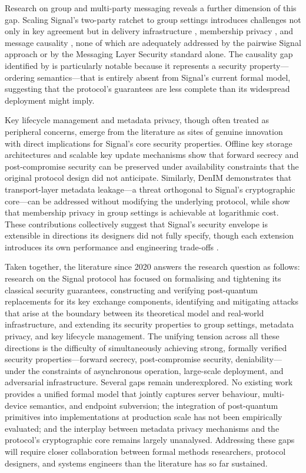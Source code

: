 Research on group and multi-party messaging reveals a further dimension of this gap. Scaling Signal's two-party ratchet to group settings introduces challenges not only in key agreement but in delivery infrastructure \parencite{paillat2024,paillat2025}, membership privacy \parencite{emura2023}, and message causality \parencite{chen2024}, none of which are adequately addressed by the pairwise Signal approach or by the Messaging Layer Security standard alone. The causality gap identified by \textcite{chen2024} is particularly notable because it represents a security property—ordering semantics—that is entirely absent from Signal's current formal model, suggesting that the protocol's guarantees are less complete than its widespread deployment might imply.

Key lifecycle management and metadata privacy, though often treated as peripheral concerns, emerge from the literature as sites of genuine innovation with direct implications for Signal's core security properties. Offline key storage architectures \parencite{almari2024} and scalable key update mechanisms \parencite{emura2023,campion2020} show that forward secrecy and post-compromise security can be preserved under availability constraints that the original protocol design did not anticipate. Similarly, DenIM \parencite{nelson2022,nelson2024} demonstrates that transport-layer metadata leakage—a threat orthogonal to Signal's cryptographic core—can be addressed without modifying the underlying protocol, while \textcite{emura2023} show that membership privacy in group settings is achievable at logarithmic cost. These contributions collectively suggest that Signal's security envelope is extensible in directions its designers did not fully specify, though each extension introduces its own performance and engineering trade-offs \parencite{bhati2024,almari2024}.

Taken together, the literature since 2020 answers the research question as follows: research on the Signal protocol has focused on formalising and tightening its classical security guarantees, constructing and verifying post-quantum replacements for its key exchange components, identifying and mitigating attacks that arise at the boundary between its theoretical model and real-world infrastructure, and extending its security properties to group settings, metadata privacy, and key lifecycle management. The unifying tension across all these directions is the difficulty of simultaneously achieving strong, formally verified security properties—forward secrecy, post-compromise security, deniability—under the constraints of asynchronous operation, large-scale deployment, and adversarial infrastructure. Several gaps remain underexplored. No existing work provides a unified formal model that jointly captures server behaviour, multi-device semantics, and endpoint subversion; the integration of post-quantum primitives into implementations at production scale has not been empirically evaluated; and the interplay between metadata privacy mechanisms and the protocol's cryptographic core remains largely unanalysed. Addressing these gaps will require closer collaboration between formal methods researchers, protocol designers, and systems engineers than the literature has so far sustained.

\printbibliography

